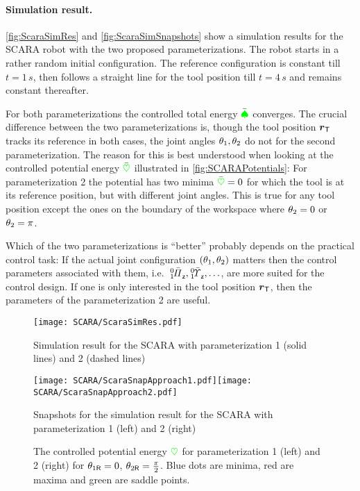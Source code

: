 \paragraph{Simulation result.}
\autoref{fig:ScaraSimRes} and \autoref{fig:ScaraSimSnapshots} show a simulation results for the SCARA robot with the two proposed parameterizations.
The robot starts in a rather random initial configuration.
The reference configuration is constant till $t=1\,\unit{s}$, then follows a straight line for the tool position till $t=4\,\unit{s}$ and remains constant thereafter.

For both parameterizations the controlled total energy $\totalEnergyC$ converges.
The crucial difference between the two parameterizations is, though the tool position $\toolPos$ tracks its reference in both cases, the joint angles $\jointAngle[1], \jointAngle[2]$ do not for the second parameterization.
The reason for this is best understood when looking at the controlled potential energy $\potentialEnergyC$ illustrated in \autoref{fig:SCARAPotentials}:
For parameterization 2 the potential has two minima $\potentialEnergyC=0$ for which the tool is at its reference position, but with different joint angles.
This is true for any tool position except the ones on the boundary of the workspace where $\jointAngle[2]=0$ or $\jointAngle[2]=\pi$.

Which of the two parameterizations is ``better'' probably depends on the practical control task:
If the actual joint configuration $(\jointAngle[1], \jointAngle[2])$ matters then the control parameters associated with them, i.e.\ $\bodyMOSCoeffC{0}{1}{\idxZ}, \bodyMODCoeffC{0}{1}{\idxZ}, \ldots$, are more suited for the control design.
If one is only interested in the tool position $\toolPos$, then the parameters of the parameterization 2 are useful.

\begin{figure}[htb]
 \centering
 \texttt{[image: SCARA/ScaraSimRes.pdf]}
 \caption{Simulation result for the SCARA with parameterization 1 (solid lines) and 2 (dashed lines)}
 \label{fig:ScaraSimRes}
\end{figure}

\begin{figure}[htb]
 \centering
 \texttt{[image: SCARA/ScaraSnapApproach1.pdf]}\texttt{[image: SCARA/ScaraSnapApproach2.pdf]}
 \caption{Snapshots for the simulation result for the SCARA with parameterization 1 (left) and 2 (right)}
 \label{fig:ScaraSimSnapshots}
\end{figure}

\begin{figure}[ht]
 \centering
 
 \caption{
 The controlled potential energy $\potentialEnergy$ for parameterization 1 (left) and 2 (right) for $\jointAngleR[1] = 0$, $\jointAngleR[2] = \tfrac{\pi}{2}$. %
 Blue dots are minima, red are maxima and green are saddle points.
 }
 \label{fig:SCARAPotentials}
\end{figure}


